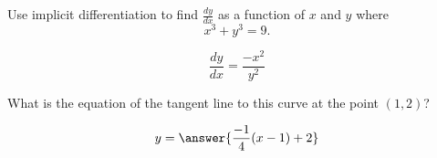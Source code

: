 \documentclass{ximera}
\author{Steven Gubkin}
\begin{document}
\begin{exercise}

Use implicit differentiation to find $\frac{dy}{dx}$ as a function of $x$ and $y$ where
\[
x^3+y^3 = 9.
\]
\begin{prompt}
\[
\frac{dy}{dx} = \frac{-x^2}{y^2}
\]
\end{prompt}
What is the equation of the tangent line to this curve at the point $(1,2)$?
\begin{prompt}
\[
y = \answer{\frac{-1}{4}(x-1)+2}
\]
\end{prompt}
\end{exercise}
\end{document}
